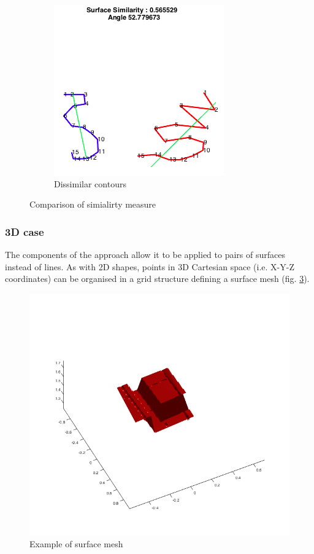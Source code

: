 \documentclass[
    floatsintext
]{article}
\begin{document}
\begin{figure}[h]
\begin{subfigure}{.44\textwidth}
    \includegraphics[width=1\linewidth]{./figures/no_correlation_2D.png}
    \caption{Dissimilar contours}
    \label{fig:no_correlation_2D}
  \end{subfigure}
  \caption{Comparison of simialirty measure}
\end{figure}

\pagebreak[2]
\subsubsection{3D case}

The components of the approach allow it to be applied to pairs of surfaces instead of lines. 
As with 2D shapes, points in 3D Cartesian space (i.e. X-Y-Z coordinates) can be organised in a grid structure defining a surface mesh (fig. \ref{fig:mesh_example}).

\begin{figure}[h]
  \centering
  \includegraphics[width=.5\textwidth]{./figures/mesh_example.png}
  \caption{Example of surface mesh}
  \label{fig:mesh_example}
\end{figure}  
\end{document}
